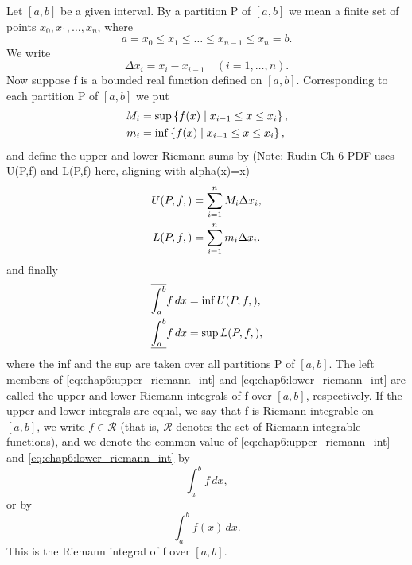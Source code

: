 \begin{definition} %
  \label{def:chap6:partition_riemann}
  Let $[a, b]$ be a given interval. By a partition P of $[a, b]$ we
  mean a finite set of points $x_0, x_1, \dots, x_n$, where
  \[ a = x_0 \le x_1 \le \dots \le x_{n-1} \le x_n = b. \]
  We write
  \[ \Delta x_i = x_i - x_{i-1} \quad (i=1, \dots, n). \]
  Now suppose f is a bounded real function defined on $[a, b]$.
  Corresponding to each partition P of $[a, b]$ we put
  \begin{align*}
    M_i &= \sup \left\{ f(x) \;\middle|\; x_{i-1} \le x \le x_i \right\}, \\
    m_i &= \inf \left\{ f(x) \;\middle|\; x_{i-1} \le x \le x_i \right\},
  \end{align*}
  and define the upper and lower Riemann sums by (Note: Rudin Ch 6
  PDF uses U(P,f) and L(P,f) here, aligning with alpha(x)=x)
  \begin{align*}
    U(P, f, ) &= \sum_{i=1}^n M_i \Delta x_i, \\
    L(P, f, ) &= \sum_{i=1}^n m_i \Delta x_i.
  \end{align*}
  and finally
  \begin{align}
    \overline{\int_{a}^{b}} f \, dx &= \inf U(P, f, ),
    \label{eq:chap6:upper_riemann_int} \\
    \underline{\int_{a}^{b}} f \, dx &= \sup L(P, f, ),
    \label{eq:chap6:lower_riemann_int}
  \end{align}
  where the inf and the sup are taken over all partitions P of $[a,
  b]$. The left members of \eqref{eq:chap6:upper_riemann_int} and
  \eqref{eq:chap6:lower_riemann_int} are called the upper and lower
  Riemann integrals of f over $[a, b]$, respectively. If the upper
  and lower integrals are equal, we say that f is Riemann-integrable
  on $[a, b]$, we write $f \in \mathcal{R}$ (that is, $\mathcal{R}$
  denotes the set of Riemann-integrable functions), and we denote the
  common value of \eqref{eq:chap6:upper_riemann_int} and
  \eqref{eq:chap6:lower_riemann_int} by
  \begin{equation} \label{eq:chap6:riemann_int_1}
    \int_{a}^{b} f \, dx,
  \end{equation}
  or by
  \begin{equation} \label{eq:chap6:riemann_int_2}
    \int_{a}^{b} f(x) \, dx.
  \end{equation}
  This is the Riemann integral of f over $[a, b]$.
\end{definition}

